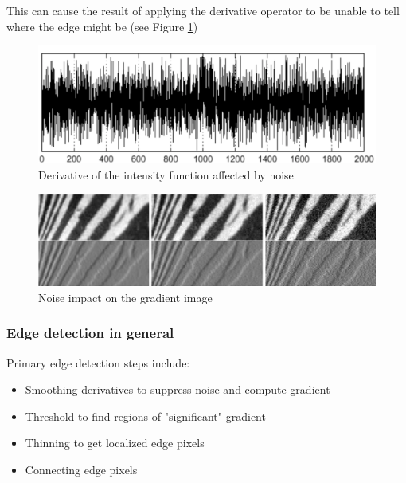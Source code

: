 This can cause the result of applying the derivative operator to be unable to tell where the edge might be (see Figure \ref{fig:noise_derivative})
\begin{figure}[H]
	\centering
	\includegraphics[width=\textwidth]{images/noise_derivative}
	\caption{Derivative of the intensity function affected by noise}
	\label{fig:noise_derivative}
\end{figure}
\begin{figure}[H]
	\centering
	\includegraphics[width=\textwidth]{images/noise_impact}
	\caption{Noise impact on the gradient image}
	\label{fig:noise_impact}
\end{figure}

\subsubsection{Edge detection in general}
Primary edge detection steps include:
\begin{itemize}
	\item Smoothing derivatives to suppress noise and compute gradient
	\item Threshold to find regions of "significant" gradient
	\item Thinning to get localized edge pixels
	\item Connecting edge pixels
\end{itemize}

